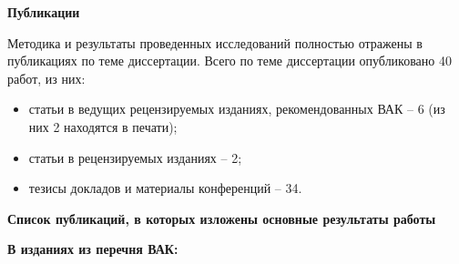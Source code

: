 \textbf{Публикации}

Методика и результаты проведенных исследований полностью отражены в публикациях по теме диссертации. Всего по теме диссертации опубликовано 40 работ, из них:
\begin{itemize}
  \item статьи в ведущих рецензируемых изданиях, рекомендованных
ВАК – 6 (из них 2 находятся в печати);
  \item статьи в рецензируемых изданиях – 2;
  \item тезисы докладов и материалы конференций – 34.
\end{itemize}

\textbf{Список публикаций, в которых изложены основные результаты работы}

\textbf{В изданиях из перечня ВАК:}

